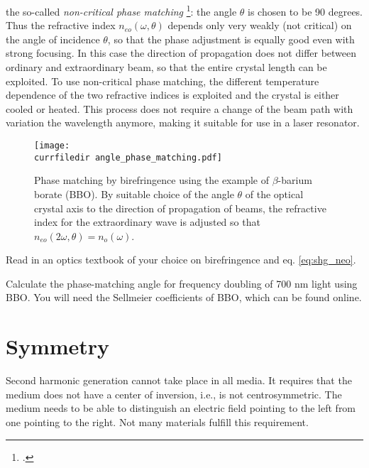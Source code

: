 the so-called \emph{non-critical phase matching}
\footcite{Demtroeder_laser,Hopf86}:
the angle $\theta$ is chosen to be 90 degrees. Thus the
refractive index $n_{eo}(\omega, \theta)$ depends only very weakly
(not critical) on the angle of incidence $\theta$, so that
the phase adjustment is equally good even with strong focusing. In this case
the direction of propagation does not differ between ordinary and
extraordinary beam, so that the entire crystal length
can be exploited. To use  non-critical
phase matching, the different
temperature dependence of the two refractive indices is exploited  and
the crystal is either cooled or heated. This process
does not require a change of the beam path with variation
the wavelength anymore, making it suitable for use in a
laser resonator.

\begin{figure}
\center
\texttt{[image: \\currfiledir angle\_phase\_matching.pdf]}
\caption{Phase matching by birefringence using the example of
$\beta$-barium borate (BBO). By suitable choice of the angle
$\theta$ of the optical crystal axis to the direction of propagation of
beams, the refractive index for the extraordinary wave is adjusted
so that $n_{eo}(2 \omega, \theta) = n_o(\omega)$. }
\label{fig:shg_angle_phase_matching}

\end{figure}

\begin{questions}
\item Read in an optics textbook of your choice on birefringence and eq. \ref{eq:shg_neo}.

\item Calculate the phase-matching angle for frequency doubling of 700 nm light using BBO. You will need the Sellmeier coefficients of BBO, which can be found online.
\end{questions}


\section{Symmetry}

Second harmonic generation cannot take place in all media. It requires that the medium does not have a center of inversion, i.e., is not centrosymmetric. The medium needs to be able to distinguish an electric field pointing to the left from one pointing to the right. Not many materials fulfill this requirement.

